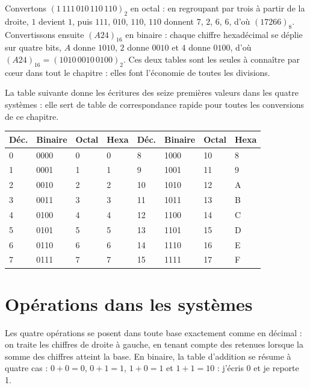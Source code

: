 \begin{exemple}
Convertons $(1\,111\,010\,110\,110)_2$ en octal : en regroupant par trois à partir de la droite, $1$ devient $1$, puis $111$, $010$, $110$, $110$ donnent $7$, $2$, $6$, $6$, d'où $(17266)_8$. Convertissons ensuite $(A24)_{16}$ en binaire : chaque chiffre hexadécimal se déplie sur quatre bits, $A$ donne $1010$, $2$ donne $0010$ et $4$ donne $0100$, d'où $(A24)_{16} = (1010\,0010\,0100)_2$. Ces deux tables sont les seules à connaître par cœur dans tout le chapitre : elles font l'économie de toutes les divisions.
\end{exemple}

La table suivante donne les écritures des seize premières valeurs dans les quatre systèmes : elle sert de table de correspondance rapide pour toutes les conversions de ce chapitre.

\begin{center}
\small
\begin{tabular}{C{1.0cm}C{1.9cm}C{1.4cm}C{1.4cm}C{1.0cm}C{1.9cm}C{1.4cm}C{1.4cm}}
\toprule
{}\textbf{Déc.} & \textbf{Binaire} & \textbf{Octal} & \textbf{Hexa} & \textbf{Déc.} & \textbf{Binaire} & \textbf{Octal} & \textbf{Hexa}\\
 & 0000 & 0 & 0 & 8 & 1000 & 10 & 8\\
1 & 0001 & 1 & 1 & 9 & 1001 & 11 & 9\\
2 & 0010 & 2 & 2 & 10 & 1010 & 12 & A\\
3 & 0011 & 3 & 3 & 11 & 1011 & 13 & B\\
4 & 0100 & 4 & 4 & 12 & 1100 & 14 & C\\
5 & 0101 & 5 & 5 & 13 & 1101 & 15 & D\\
6 & 0110 & 6 & 6 & 14 & 1110 & 16 & E\\
7 & 0111 & 7 & 7 & 15 & 1111 & 17 & F\\
\bottomrule
\end{tabular}
\label{ch3:tab:corresp}
\end{center}

\section{Opérations dans les systèmes}

Les quatre opérations se posent dans toute base exactement comme en décimal : on traite les chiffres de droite à gauche, en tenant compte des retenues lorsque la somme des chiffres atteint la base. En binaire, la table d'addition se résume à quatre cas : $0+0=0$, $0+1=1$, $1+0=1$ et $1+1=10$ : j'écris 0 et je reporte 1.

